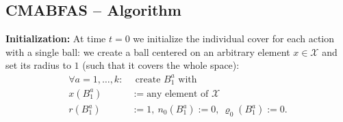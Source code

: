 \documentclass{llncs}
\begin{document}
\subsection{CMABFAS -- Algorithm} 
\label{sec:algo_implementation}
{\bf \noindent Initialization:} At time $t=0$ we initialize the individual cover for each action with a single ball: 
we create a ball centered on an arbitrary element $x \in \mathcal X$ and set its radius to $1$
(such that it covers the whole space):
\begin{align*}
\forall a=1,\ldots,k: & \ \ \text{create } B_1^a \text{ with} \\
x(B_1^a) & := \text{any element of } \mathcal X \\
r(B_1^a) & :=1, \ n_0(B_1^a):=0, \ \varrho_0(B_1^a):=0. 
\end{align*}
\end{document}
